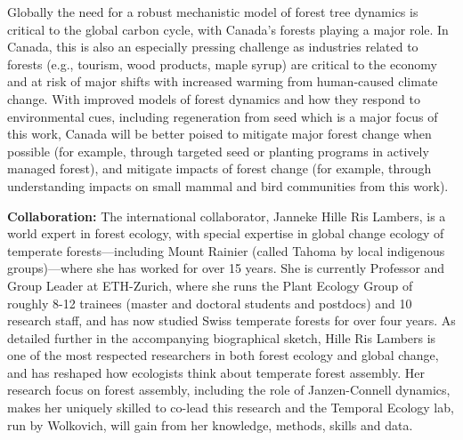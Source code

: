 \documentclass[11pt]{article}
\begin{document}
Globally the need for a robust mechanistic model of forest tree dynamics is critical to the global carbon cycle, with Canada's forests playing a major role. In Canada, this is also an especially pressing challenge as industries related to forests (e.g., tourism, wood products, maple syrup) are critical to the economy and at risk of major shifts with increased warming from human-caused climate change. With improved models of forest dynamics and how they respond to environmental cues, including regeneration from seed which is a major focus of this work, Canada will be better poised to mitigate major forest change when possible (for example, through targeted seed or planting programs in actively managed forest), and mitigate impacts of forest change (for example, through understanding impacts on small mammal and bird communities from this work). 


{\bf Collaboration:} %
The international collaborator, Janneke Hille Ris Lambers, is a world expert in forest ecology, with special expertise in global change ecology of temperate forests---including Mount Rainier (called Tahoma by local indigenous groups)---where she has worked for over 15 years. She is currently Professor and Group Leader at ETH-Zurich, where she runs the Plant Ecology Group of roughly 8-12 trainees (master and doctoral students and postdocs) and 10 research staff, and has now studied Swiss temperate forests for over four years. As detailed further in the accompanying biographical sketch, Hille Ris Lambers is one of the most respected researchers in both forest ecology and global change, and has reshaped how ecologists think about temperate forest assembly. Her research focus on forest assembly, including the role of Janzen-Connell dynamics, makes her uniquely skilled to co-lead this research and the Temporal Ecology lab, run by Wolkovich, will gain from her knowledge, methods, skills and data. 
\end{document}
